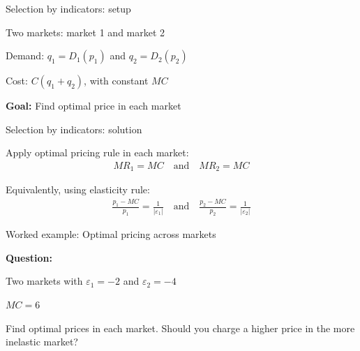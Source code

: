 \documentclass[notes,11pt, aspectratio=169]{beamer}
\newenvironment{wideitemize}{\itemize\addtolength{\itemsep}{10pt}}{\enditemize}
\begin{document}
\begin{frame}{Selection by indicators: setup}
	\begin{wideitemize}
		\item Two markets: market 1 and market 2
		\item Demand: $q_1 = D_1(p_1)$ and $q_2 = D_2(p_2)$
		\item Cost: $C(q_1 + q_2)$, with constant $MC$
		\item \textbf{Goal:} Find optimal price in each market
	\end{wideitemize}
\end{frame}

\begin{frame}{Selection by indicators: solution}
	\begin{wideitemize}
		\item Apply optimal pricing rule in each market:
		\begin{align*}
			MR_1 = MC \quad \text{and} \quad MR_2 = MC
		\end{align*}
		\item Equivalently, using elasticity rule:
		\begin{align*}
			\frac{p_1 - MC}{p_1} = \frac{1}{|\varepsilon_1|} \quad \text{and} \quad \frac{p_2 - MC}{p_2} = \frac{1}{|\varepsilon_2|}
		\end{align*}
	\end{wideitemize}
\end{frame}

\begin{frame}{Worked example: Optimal pricing across markets}
	\begin{wideitemize}
		\item \textbf{Question:}
		\item Two markets with $\varepsilon_1 = -2$ and $\varepsilon_2 = -4$
		\item $MC = 6$
		\item Find optimal prices in each market. Should you charge a higher price in the more inelastic market?
	\end{wideitemize}
\end{frame}
\end{document}

